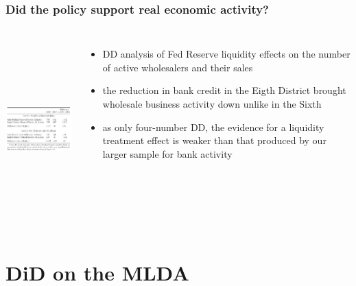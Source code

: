 \documentclass{beamer}
\begin{document}
\begin{frame}
\frametitle{Did the policy support real economic activity? }

 \begin{columns}
\includegraphics[width=6cm,height=7cm,keepaspectratio]{Table 5.1} 

\begin{itemize}
	\item DD analysis of Fed Reserve liquidity effects on the number of active wholesalers and their sales
	\item the reduction in bank credit in the Eigth District brought wholesale business activity down unlike in the Sixth
	\item as only four-number DD, the evidence for a liquidity treatment effect is weaker than that produced by our larger sample for bank activity

\end{itemize}

\end{columns}

\end{frame}




\section{DiD on the MLDA}
\end{document}
